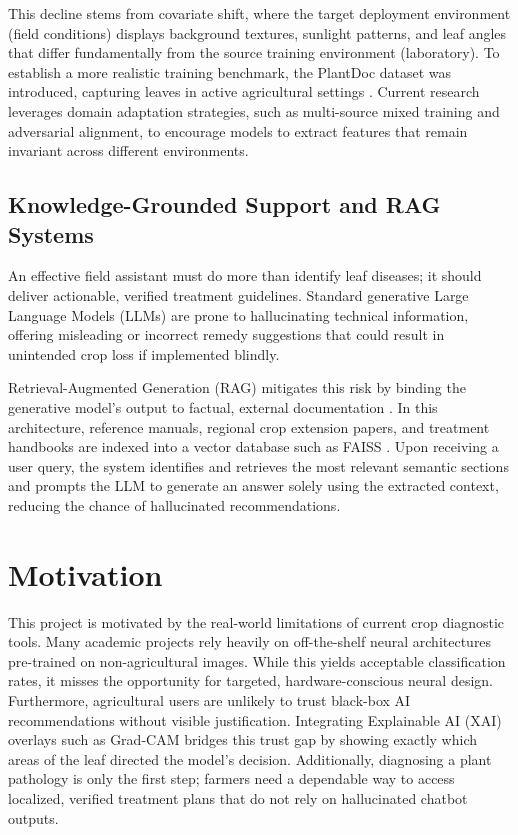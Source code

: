 \documentclass[12pt, a4paper]{report}
\begin{document}
This decline stems from covariate shift, where the target deployment environment (field conditions) displays background textures, sunlight patterns, and leaf angles that differ fundamentally from the source training environment (laboratory). To establish a more realistic training benchmark, the PlantDoc dataset was introduced, capturing leaves in active agricultural settings \cite{plantdoc}. Current research leverages domain adaptation strategies, such as multi-source mixed training and adversarial alignment, to encourage models to extract features that remain invariant across different environments.

\subsection{Knowledge-Grounded Support and RAG Systems}
An effective field assistant must do more than identify leaf diseases; it should deliver actionable, verified treatment guidelines. Standard generative Large Language Models (LLMs) are prone to hallucinating technical information, offering misleading or incorrect remedy suggestions that could result in unintended crop loss if implemented blindly.

Retrieval-Augmented Generation (RAG) mitigates this risk by binding the generative model's output to factual, external documentation \cite{rag}. In this architecture, reference manuals, regional crop extension papers, and treatment handbooks are indexed into a vector database such as FAISS \cite{faiss}. Upon receiving a user query, the system identifies and retrieves the most relevant semantic sections and prompts the LLM to generate an answer solely using the extracted context, reducing the chance of hallucinated recommendations.

\section{Motivation}
This project is motivated by the real-world limitations of current crop diagnostic tools. Many academic projects rely heavily on off-the-shelf neural architectures pre-trained on non-agricultural images. While this yields acceptable classification rates, it misses the opportunity for targeted, hardware-conscious neural design. Furthermore, agricultural users are unlikely to trust black-box AI recommendations without visible justification. Integrating Explainable AI (XAI) overlays such as Grad-CAM \cite{gradcam} bridges this trust gap by showing exactly which areas of the leaf directed the model's decision. Additionally, diagnosing a plant pathology is only the first step; farmers need a dependable way to access localized, verified treatment plans that do not rely on hallucinated chatbot outputs.
\end{document}
